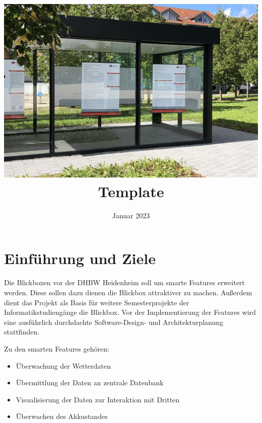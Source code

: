 \documentclass[
]{article}
\title{\includegraphics{header.jpg} Template}
\author{}
\date{Januar 2023}
\begin{document}
\maketitle
\hypertarget{section-introduction-and-goals}{%
\section{Einführung und Ziele}\label{section-introduction-and-goals}}
Die Blickboxen vor der DHBW Heidenheim soll um smarte Features erweitert werden.
Diese sollen dazu dienen die Blickbox attraktiver zu machen.
Außerdem dient das Projekt als Basis für weitere Semesterprojekte der Informatikstudiengänge die Blickbox.
Vor der Implementierung der Features wird eine ausführlich durchdachte Software-Design- und Architekturplanung stattfinden.

Zu den smarten Features gehören:
\begin{itemize}
  \item Überwachung der Wetterdaten
  \item Übermittlung der Daten an zentrale Datenbank
  \item Visualisierung der Daten zur Interaktion mit Dritten
  \item Überwachen des Akkustandes
\end{itemize}
\end{document}
